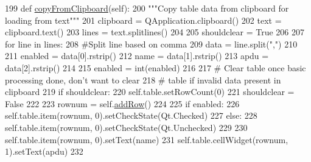 \begin{DoxyCode}
199     \textcolor{keyword}{def }\hyperlink{classsoftware_1_1chipwhisperer_1_1capture_1_1targets_1_1__smartcard__gui_1_1SmartCardGUICard_a8eedbb4976c4d96644d3c2652f0dcdc2}{copyFromClipboard}(self):
200         \textcolor{stringliteral}{"""Copy table data from clipboard for loading from text"""}
201         clipboard = QApplication.clipboard()
202         text = clipboard.text()        
203         lines = text.splitlines()
204         
205         shouldclear = \textcolor{keyword}{True}        
206         
207         \textcolor{keywordflow}{for} line \textcolor{keywordflow}{in} lines:
208             \textcolor{comment}{#Split line based on comma}
209             data = line.split(\textcolor{stringliteral}{","})
210             
211             enabled = data[0].rstrip()
212             name = data[1].rstrip()
213             apdu = data[2].rstrip()
214             
215             enabled = int(enabled)
216             
217             \textcolor{comment}{# Clear table once basic processing done, don't want to clear}
218             \textcolor{comment}{# table if invalid data present in clipboard}
219             \textcolor{keywordflow}{if} shouldclear:
220                 self.table.setRowCount(0)
221                 shouldclear = \textcolor{keyword}{False}
222             
223             rownum = self.\hyperlink{classsoftware_1_1chipwhisperer_1_1capture_1_1targets_1_1__smartcard__gui_1_1SmartCardGUICard_a77d926d83cf24050c5e5e6efa7bb53f4}{addRow}()
224             
225             \textcolor{keywordflow}{if} enabled:
226                 self.table.item(rownum, 0).setCheckState(Qt.Checked)
227             \textcolor{keywordflow}{else}:
228                 self.table.item(rownum, 0).setCheckState(Qt.Unchecked)
229                 
230             self.table.item(rownum, 0).setText(name)                
231             self.table.cellWidget(rownum, 1).setText(apdu)
232             
\end{DoxyCode}
\hypertarget{classsoftware_1_1chipwhisperer_1_1capture_1_1targets_1_1__smartcard__gui_1_1SmartCardGUICard_ae9a4a165796832cab0aa2c4593fc1bbe}{}
